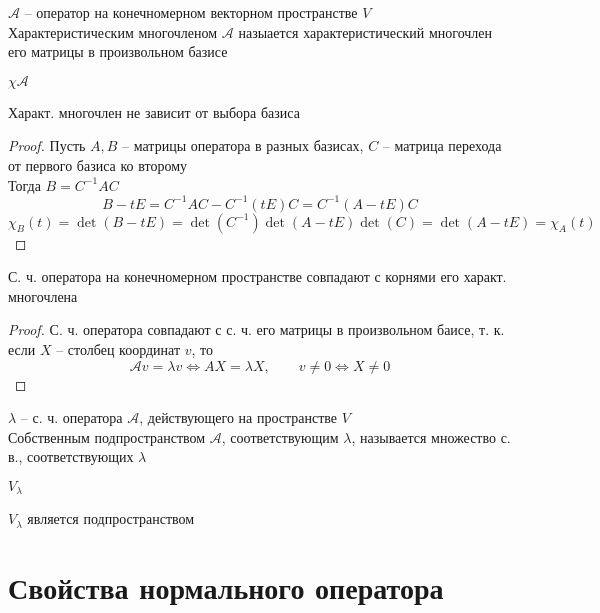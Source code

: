 \begin{definition}
	$ \mathcal{A} $ -- оператор на конечномерном векторном пространстве $ V $ \\
	Характеристическим многочленом $ \mathcal{A} $ назыается характеристический многочлен его матрицы в произвольном базисе
\end{definition}

\begin{notation}
	$ \chi \mathcal{A} $
\end{notation}

\begin{props}
	\item Характ. многочлен не зависит от выбора базиса
	\begin{proof}
		Пусть $ A, B $ -- матрицы оператора в разных базисах, $ C $ -- матрица перехода от первого базиса ко второму \\
		Тогда $ B = C^{-1}AC $
		$$ B - tE = C^{-1}AC - C^{-1}(tE)C = C^{-1}(A - tE)C $$
		$$ \chi_B(t) = \det(B - tE) = \det(C^{-1})\det(A - tE)\det(C) = \det(A - tE) = \chi_A(t) $$
	\end{proof}
	\item С. ч. оператора на конечномерном пространстве совпадают с корнями его характ. многочлена
	\begin{proof}
		С. ч. оператора совпадают с с. ч. его матрицы в произвольном баисе, т. к. если $ X $ -- столбец координат $ v $, то
		$$ \mathcal{A} v = \lambda v \iff AX = \lambda X, \qquad v \ne 0 \iff X \ne 0 $$
	\end{proof}
\end{props}

\begin{definition}
	$ \lambda $ -- с. ч. оператора $ \mathcal{A} $, действующего на пространстве $ V $ \\
	Собственным подпространством $ \mathcal{A} $, соответствующим $ \lambda $, называется множество с. в., соответствующих $ \lambda $
\end{definition}

\begin{notation}
	$ V_\lambda $
\end{notation}

\begin{property}
	$ V_\lambda $ является подпространством
\end{property}

\section{Свойства нормального оператора}

